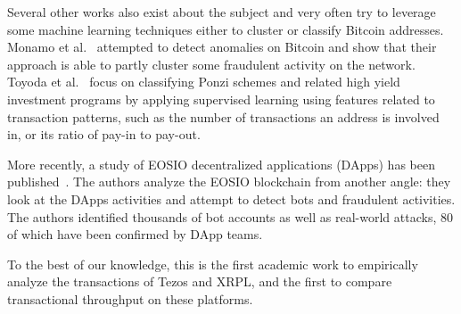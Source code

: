 Several other works also exist about the subject and very often try to leverage some machine learning techniques either to cluster or classify Bitcoin addresses. Monamo et al.~\cite{7802939} attempted to detect anomalies on Bitcoin and show that their approach is able to partly cluster some fraudulent activity on the network. Toyoda et al.~\cite{8254420} focus on classifying Ponzi schemes and related high yield investment programs by applying supervised learning using features related to transaction patterns, such as the number of transactions an address is involved in, or its ratio of pay-in to pay-out. 

More recently, a study of EOSIO decentralized applications (DApps) has been published~\cite{huang2020characterizing}.
The authors analyze the EOSIO blockchain from another angle: they look at the DApps activities and attempt to detect bots and fraudulent activities.
The authors identified thousands of bot accounts as well as real-world attacks, 80 of which have been confirmed by DApp teams.

To the best of our knowledge, this is the first academic work to empirically analyze the transactions of Tezos and XRPL, and the first to compare transactional throughput on these platforms.
